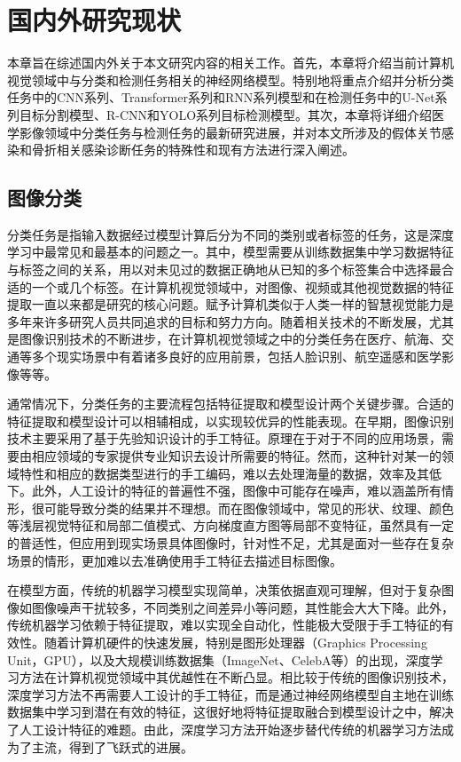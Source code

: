 \chapter{国内外研究现状}\label{chap:related_work}

本章旨在综述国内外关于本文研究内容的相关工作。首先，本章将介绍当前计算机视觉领域中与分类和检测任务相关的神经网络模型。特别地将重点介绍并分析分类任务中的CNN系列、Transformer系列和RNN系列模型和在检测任务中的U-Net系列目标分割模型、R-CNN和YOLO系列目标检测模型。其次，本章将详细介绍医学影像领域中分类任务与检测任务的最新研究进展，并对本文所涉及的假体关节感染和骨折相关感染诊断任务的特殊性和现有方法进行深入阐述。

\section{图像分类}

分类任务是指输入数据经过模型计算后分为不同的类别或者标签的任务，这是深度学习中最常见和最基本的问题之一。其中，模型需要从训练数据集中学习数据特征与标签之间的关系，用以对未见过的数据正确地从已知的多个标签集合中选择最合适的一个或几个标签。在计算机视觉领域中，对图像、视频或其他视觉数据的特征提取一直以来都是研究的核心问题。赋予计算机类似于人类一样的智慧视觉能力是多年来许多研究人员共同追求的目标和努力方向。随着相关技术的不断发展，尤其是图像识别技术的不断进步，在计算机视觉领域之中的分类任务在医疗、航海、交通等多个现实场景中有着诸多良好的应用前景，包括人脸识别、航空遥感和医学影像等等。

通常情况下，分类任务的主要流程包括特征提取和模型设计两个关键步骤。合适的特征提取和模型设计可以相辅相成，以实现较优异的性能表现。在早期，图像识别技术\cite{fu1976pattern}主要采用了基于先验知识设计的手工特征。原理在于对于不同的应用场景，需要由相应领域的专家提供专业知识去设计所需要的特征。然而，这种针对某一的领域特性和相应的数据类型进行的手工编码，难以去处理海量的数据，效率及其低下\cite{季长清2022基于卷积神经网络的图像分类算法综述}。此外，人工设计的特征的普遍性不强，图像中可能存在噪声，难以涵盖所有情形，很可能导致分类的结果并不理想。而在图像领域中，常见的形状、纹理、颜色等浅层视觉特征和局部二值模式、方向梯度直方图等局部不变特征，虽然具有一定的普适性，但应用到现实场景具体图像时，针对性不足，尤其是面对一些存在复杂场景的情形，更加难以去准确使用手工特征去描述目标图像\cite{杨真真2018基于卷积神经网络的图像分类算法综述}。

在模型方面，传统的机器学习模型实现简单，决策依据直观可理解，但对于复杂图像如图像噪声干扰较多，不同类别之间差异小等问题，其性能会大大下降。此外，传统机器学习依赖于特征提取，难以实现全自动化，性能极大受限于手工特征的有效性。随着计算机硬件的快速发展，特别是图形处理器（Graphics Processing Unit，GPU），以及大规模训练数据集（ImageNet\cite{deng2009imagenet}、CelebA\cite{liu2018large}等）的出现，深度学习方法在计算机视觉领域中其优越性在不断凸显。相比较于传统的图像识别技术，深度学习方法不再需要人工设计的手工特征，而是通过神经网络模型自主地在训练数据集中学习到潜在有效的特征，这很好地将特征提取融合到模型设计之中，解决了人工设计特征的难题。由此，深度学习方法开始逐步替代传统的机器学习方法成为了主流，得到了飞跃式的进展。

